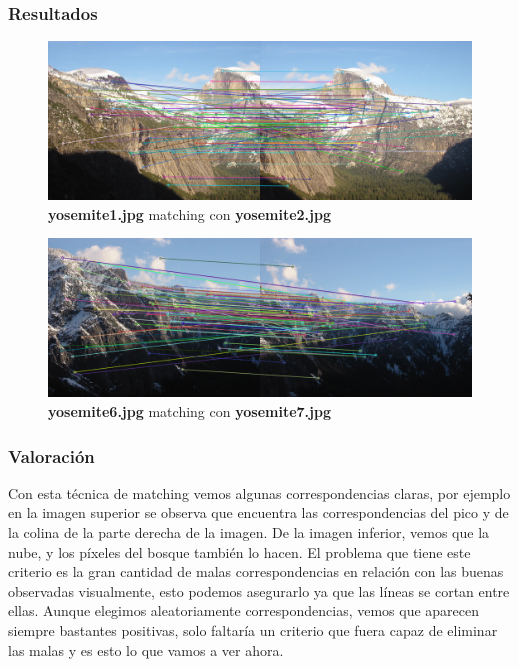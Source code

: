 \documentclass{article}
\begin{document}
\newpage

\subsubsection{Resultados}

\begin{figure}[hbt!]
	\centering
	\includegraphics[width=1.0\textwidth]{../assets/Ejercicio2-Bruteforce.png}
	\caption{\textbf{yosemite1.jpg} matching con \textbf{yosemite2.jpg}}
\end{figure}

\begin{figure}[hbt!]
	\centering
	\includegraphics[width=1.0\textwidth]{../assets/Ejercicio2-Bruteforce-2.png}
	\caption{\textbf{yosemite6.jpg} matching con \textbf{yosemite7.jpg}}
\end{figure}

\subsubsection{Valoración}

Con esta técnica de matching vemos algunas correspondencias claras, por ejemplo en la imagen superior se observa que encuentra las correspondencias del pico y de la colina de la parte derecha de la imagen. De la imagen inferior, vemos que la nube, y los píxeles del bosque también lo hacen.
\newline
El problema que tiene este criterio es la gran cantidad de malas correspondencias en relación con las buenas observadas visualmente, esto podemos asegurarlo ya que las líneas se cortan entre ellas.
\newline
Aunque elegimos aleatoriamente correspondencias, vemos que aparecen siempre bastantes positivas, solo faltaría un criterio que fuera capaz de eliminar las malas y es esto lo que vamos a ver ahora.
\end{document}
